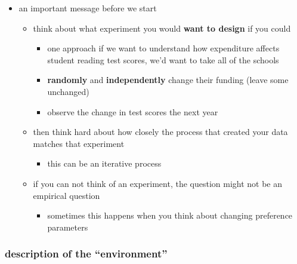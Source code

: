 \documentclass[11pt]{article}
\begin{document}
\begin{itemize}
\item an important message before we start
\begin{itemize}
\item think about what experiment you would \textbf{want to design} if you
          could
\begin{itemize}
\item one approach if we want to understand how expenditure affects student
            reading test scores, we'd want to take all of the schools
\item \textbf{randomly} and \textbf{independently} change their funding (leave
            some unchanged)
\item observe the change in test scores the next year
\end{itemize}
\item then think hard about how closely the process that created
          your data matches that experiment
\begin{itemize}
\item this can be an iterative process
\end{itemize}
\item if you can not think of an experiment, the question might not
          be an empirical question
\begin{itemize}
\item sometimes this happens when you think about changing
            preference parameters
\end{itemize}
\end{itemize}
\end{itemize}
\subsubsection{description of the ``environment''}
\label{sec-1-1-3}
\end{document}

